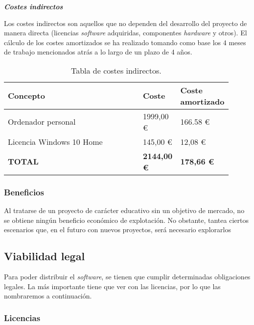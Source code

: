 \textbf{\textit{Costes indirectos}}

Los costes indirectos son aquellos que no dependen del desarrollo del proyecto de manera directa (licencias \textit{software} adquiridas, componentes \textit{hardware} y otros). El cálculo de los costes amortizados se ha realizado tomando como base los 4 meses de trabajo mencionados atrás a lo largo de un plazo de 4 años.

\begin{table}[H]
	\centering
	\begin{tabular}{>{\raggedright}m{0.6\linewidth}>{\raggedleft}m{0.16\linewidth}>{\raggedleft\arraybackslash}m{0.15\linewidth}}
		\toprule
		\textbf{{Concepto}}  & \textbf{{Coste}} & \textbf{{Coste amortizado}} \\
		\midrule
		\small{\scriptsize Ordenador personal} & \small{1999,00 €} & \small{166.58 €} \\
		\small{\scriptsize Licencia Windows 10 Home} & \small{145,00 €} & \small{12,08 €} \\
		\bottomrule
		\textbf{{\scriptsize TOTAL}}  & \textbf{\small 2144,00 €} & \textbf{\small 178,66 €} \\
		\bottomrule
	\end{tabular}
	\caption{Tabla de costes indirectos.}
\end{table}

\subsubsection{Beneficios}

Al tratarse de un proyecto de carácter educativo sin un objetivo de mercado, no se obtiene ningún beneficio económico de explotación. No obstante, tantea ciertos escenarios que, en el futuro con nuevos proyectos, será necesario explorarlos

\subsection{Viabilidad legal}

Para poder distribuir el \textit{software}, se tienen que cumplir determinadas obligaciones legales. La más importante tiene que ver con las licencias, por lo que las nombraremos a continuación.

\subsubsection{Licencias}

